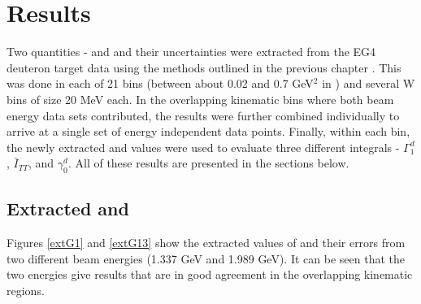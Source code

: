 \clearpage
%
\chapter{Results}
\label{cha:results}





Two quantities - \gone and \afone and their uncertainties were extracted from the EG4 deuteron target data  
using the methods outlined in %
the previous chapter%
. This was done in each of 21 \qsqs bins (between about 0.02 and 0.7 GeV$^2$ in \qsq) %
and several W bins of size 20 MeV each. In the overlapping kinematic bins where both beam energy data sets 
contributed, the results were further combined individually to arrive at a single set of energy independent 
data points. Finally, within each \qsqs bin, the newly extracted \gones and \afones values were used to evaluate 
three different integrals - $\Gamma^d_1$, $\bar{I}_{TT}$, and $\gamma^d_0$. All of these results are presented
in the sections below.


\section{Extracted \gones and \afone}
Figures \ref{extG1} and \ref{extG13} show the extracted values of \gones and their errors from two different beam energies (1.337 GeV and 1.989 GeV). %
It can be seen that the two energies give results that are in good agreement in the overlapping kinematic regions.

